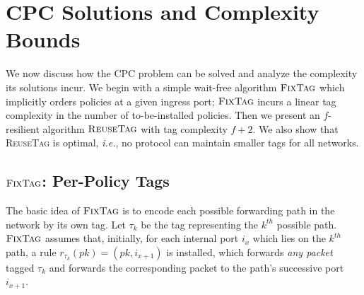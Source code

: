 \documentclass[11pt,pdftex,letter]{article}
\newcommand{\CPO}{\textsc{FixTag}}
\newcommand{\DPO}{\textsc{ReuseTag}}
\newcommand{\ie}{{\it i.e.}}
\newcommand{\mcnote}[1]{\textcolor{heraldBlue}{\small \bf [MC: #1]}}
\newcommand{\mcnote}[1]{}
\begin{document}
\section{CPC Solutions and Complexity Bounds}\label{sec:solution}

We now discuss how the CPC problem can be solved and analyze the
complexity its solutions incur. We begin with a simple wait-free
algorithm $\CPO$ which implicitly orders policies at a given ingress port;
$\CPO$ incurs a linear tag complexity in the number of to-be-installed policies.
Then we present an $f$-resilient algorithm $\DPO$ with
tag complexity $f+2$.
We also show that {\DPO} is optimal, \ie, no
protocol can maintain smaller tags for all networks.

\subsection{$\CPO$: Per-Policy Tags}\label{ssec:path-algo}

The basic idea of $\CPO$ is to encode each possible forwarding path in
the network by its own tag.
Let $\tau_k$ be the tag representing the $k^{\mathit{th}}$ possible path.
$\CPO$  assumes that, initially, for each internal port $i_x$
which lies on the $k^{\mathit{th}}$ path, a rule $r_{\tau_k}(pk)=(pk,
i_{x+1})$ is installed, which forwards \emph{any packet} tagged
$\tau_k$ and forwards the corresponding packet to the path's
successive port $i_{x+1}$.
\end{document}
